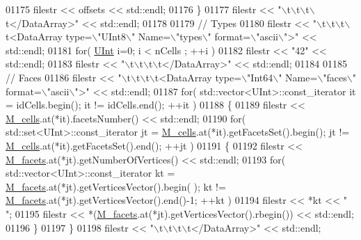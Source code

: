 \begin{DoxyCode}
01175         filestr << offsets << std::endl;
01176     \}
01177     filestr << \textcolor{stringliteral}{"\(\backslash\)t\(\backslash\)t\(\backslash\)t\(\backslash\)t</DataArray>"} << std::endl;
01178 
01179     \textcolor{comment}{//  Types}
01180     filestr << \textcolor{stringliteral}{"\(\backslash\)t\(\backslash\)t\(\backslash\)t\(\backslash\)t<DataArray type=\(\backslash\)"UInt8\(\backslash\)" Name=\(\backslash\)"types\(\backslash\)" format=\(\backslash\)"ascii\(\backslash\)">"} << std::endl;
01181     \textcolor{keywordflow}{for}( \hyperlink{namespaceFVCode3D_a4bf7e328c75d0fd504050d040ebe9eda}{UInt} i=0; i < nCells ; ++i )
01182         filestr << \textcolor{stringliteral}{"42"} << std::endl;
01183     filestr << \textcolor{stringliteral}{"\(\backslash\)t\(\backslash\)t\(\backslash\)t\(\backslash\)t</DataArray>"} << std::endl;
01184 
01185     \textcolor{comment}{//  Faces}
01186     filestr << \textcolor{stringliteral}{"\(\backslash\)t\(\backslash\)t\(\backslash\)t\(\backslash\)t<DataArray type=\(\backslash\)"Int64\(\backslash\)" Name=\(\backslash\)"faces\(\backslash\)" format=\(\backslash\)"ascii\(\backslash\)">"} << std::endl;
01187     \textcolor{keywordflow}{for}( std::vector<UInt>::const\_iterator it = idCells.begin(); it != idCells.end(); ++it )
01188     \{
01189         filestr << \hyperlink{classFVCode3D_1_1Mesh3D_a8cac877e809226fb96078183efb25a2f}{M\_cells}.at(*it).facetsNumber() << std::endl;
01190         \textcolor{keywordflow}{for}( std::set<UInt>::const\_iterator jt = \hyperlink{classFVCode3D_1_1Mesh3D_a8cac877e809226fb96078183efb25a2f}{M\_cells}.at(*it).getFacetsSet().begin(); jt != 
      \hyperlink{classFVCode3D_1_1Mesh3D_a8cac877e809226fb96078183efb25a2f}{M\_cells}.at(*it).getFacetsSet().end(); ++jt )
01191         \{
01192             filestr << \hyperlink{classFVCode3D_1_1Mesh3D_a57d8b6af7f4385d749c2d83c235764de}{M\_facets}.at(*jt).getNumberOfVertices() << std::endl;
01193             \textcolor{keywordflow}{for}( std::vector<UInt>::const\_iterator kt = \hyperlink{classFVCode3D_1_1Mesh3D_a57d8b6af7f4385d749c2d83c235764de}{M\_facets}.at(*jt).getVerticesVector().begin(
      ); kt != \hyperlink{classFVCode3D_1_1Mesh3D_a57d8b6af7f4385d749c2d83c235764de}{M\_facets}.at(*jt).getVerticesVector().end()-1; ++kt )
01194                 filestr << *kt << \textcolor{stringliteral}{" "};
01195             filestr << *(\hyperlink{classFVCode3D_1_1Mesh3D_a57d8b6af7f4385d749c2d83c235764de}{M\_facets}.at(*jt).getVerticesVector().rbegin()) << std::endl;
01196         \}
01197     \}
01198     filestr << \textcolor{stringliteral}{"\(\backslash\)t\(\backslash\)t\(\backslash\)t\(\backslash\)t</DataArray>"} << std::endl;

\end{DoxyCode}
